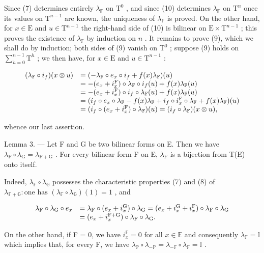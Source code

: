Since (7) determines entirely \(\lambda_{\mathbb{F}}\) on \(\mathrm{T}^{0}\) , and since (10) determines \(\lambda_{\mathbb{F}}\) on \(\mathrm{T}^{n}\) once its values on \(\mathrm{T}^{n-1}\) are known, the uniqueness of \(\lambda_{\mathbb{F}}\) is proved. On the other hand, for \(x \in \mathrm{E}\) and \(u \in \mathrm{T}^{n-1}\) the right-hand side of (10) is bilinear on \(\mathrm{E} \times \mathrm{T}^{n-1}\) ; this proves the existence of \(\lambda_{\mathbb{F}}\) by induction on \(n\) . It remains to prove (9), which we shall do by induction; both sides of (9) vanish on \(\mathrm{T}^{0}\) ; suppose (9) holds on \(\sum_{h=0}^{n-1} \mathrm{T}^{h}\) ; we then have, for \(x \in \mathrm{E}\) and \(u \in \mathrm{T}^{n-1}\) :

\[
\begin{array}{r l} (\lambda_ {\mathbb {F}} \circ i _ {f}) (x \otimes u) & = (- \lambda_ {\mathbb {F}} \circ e _ {x} \circ i _ {f} + f (x) \lambda_ {\mathbb {F}}) (u) \\ & = - (e _ {x} + i _ {x} ^ {\mathrm{F}}) \circ \lambda_ {\mathbb {F}} \circ i _ {f} (u) + f (x) \lambda_ {\mathbb {F}} (u) \\ & = - (e _ {x} + i _ {x} ^ {\mathrm{F}}) \circ i _ {f} \circ \lambda_ {\mathbb {F}} (u) + f (x) \lambda_ {\mathbb {F}} (u) \\ & = (i _ {f} \circ e _ {x} \circ \lambda_ {\mathbb {F}} - f (x) \lambda_ {\mathbb {F}} + i _ {f} \circ i _ {x} ^ {\mathrm{F}} \circ \lambda_ {\mathbb {F}} + f (x) \lambda_ {\mathbb {F}}) (u) \\ & = (i _ {f} \circ (e _ {x} + i _ {x} ^ {\mathrm{F}}) \circ \lambda_ {\mathbb {F}}) (u) = (i _ {f} \circ \lambda_ {\mathbb {F}}) (x \otimes u), \end{array}
\]

whence our last assertion.

Lemma 3. --- Let F and G be two bilinear forms on E. Then we have \(\lambda_{\mathrm{F}} \circ \lambda_{\mathrm{G}} = \lambda_{\mathrm{F+G}}\) . For every bilinear form F on E, \(\lambda_{\mathrm{F}}\) is a bijection from T(E) onto itself.

Indeed, \(\lambda_{\mathbb{F}} \circ \lambda_{\mathbb{G}}\) possesses the characteristic properties (7) and (8) of \(\lambda_{\mathbb{F} + \mathbb{G}}: \text{one has } (\lambda_{\mathbb{F}} \circ \lambda_{\mathbb{G}})(1) = 1\) , and

\[
\begin{array}{r l} \lambda_ {\mathrm{F}} \circ \lambda_ {\mathrm{G}} \circ e _ {x} & = \lambda_ {\mathrm{F}} \circ (e _ {x} + i _ {x} ^ {\mathrm{G}}) \circ \lambda_ {\mathrm{G}} = (e _ {x} + i _ {x} ^ {\mathrm{G}} + i _ {x} ^ {\mathrm{F}}) \circ \lambda_ {\mathrm{F}} \circ \lambda_ {\mathrm{G}} \\ & = (e _ {x} + i _ {x} ^ {\mathrm{F+G}}) \circ \lambda_ {\mathrm{F}} \circ \lambda_ {\mathrm{G}}. \end{array}
\]

On the other hand, if F = 0, we have \(i_x^{\mathbb{F}} = 0\) for all \(x \in \mathbb{E}\) and consequently \(\lambda_{\mathbb{F}} = \mathbb{I}\) which implies that, for every F, we have \(\lambda_{\mathbb{P}} \circ \lambda_{-\mathbb{P}} = \lambda_{-\mathbb{F}} \circ \lambda_{\mathbb{F}} = \mathbb{I}\) .

